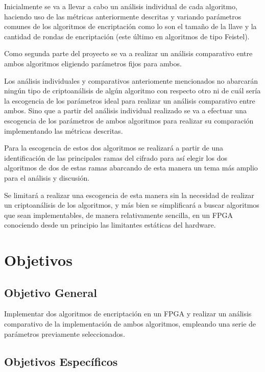 Inicialmente se va a llevar a cabo un análisis individual de cada algoritmo, haciendo uso de las métricas anteriormente descritas y variando parámetros comunes de los algoritmos de encriptación como lo son el tamaño de la llave y la cantidad de rondas de encriptación (este último en algoritmos de tipo Feistel). 

Como segunda parte del proyecto se va a realizar un análisis comparativo entre ambos algoritmos eligiendo parámetros fijos para ambos.

Los análisis individuales y comparativos anteriomente mencionados no abarcarán ningún tipo de criptoanálisis de algún algoritmo con respecto otro ni de cuál sería la escogencia de los parámetros ideal para realizar un análisis comparativo entre ambos. Sino que a partir del análisis individual realizado se va a efectuar una escogencia de los parámetros de ambos algoritmos para realizar su comparación implementando las métricas descritas.

Para la escogencia de estos dos algoritmos se realizará a partir de una identificación de las principales ramas del cifrado para así elegir los dos algoritmos de dos de estas ramas abarcando de esta manera un tema más amplio para el análisis y discusión.

Se limitará a realizar una escogencia de esta manera sin la necesidad de realizar un criptoanálisis de los algoritmos, y más bien se simplificará a buscar algoritmos que sean implementables, de manera relativamente sencilla, en un FPGA conociendo desde un principio las limitantes estáticas del hardware.


\section{Objetivos}

\subsection{Objetivo General}

Implementar dos algoritmos de encriptación en un FPGA y realizar un análisis comparativo de la implementación de ambos algoritmos, empleando una serie de parámetros previamente seleccionados.


\subsection{Objetivos Específicos}

